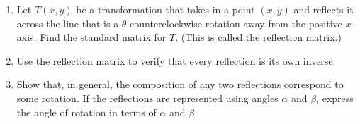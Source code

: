 \documentclass{article}
\begin{document}
\begin{enumerate}
\begin{enumerate}
        \item \(\cos(\alpha - \beta) = \cos\alpha\cos\beta + \sin\alpha\sin\beta\)\begin{proof}
            From \textbf{b}, we have\[
                \begin{bmatrix}
                    \colorbox{Periwinkle!42}{\(\cos\alpha\cos\beta + \sin\alpha\sin\beta\)}&-\sin\alpha\cos\beta+\cos\alpha\sin\beta \\ 
                    \sin\alpha\cos\beta - \cos\alpha\sin\beta& \sin\alpha\sin\beta + \cos\alpha\cos\beta
                \end{bmatrix} = \begin{bmatrix}
                    \colorbox{Periwinkle!42}{\(\cos(\alpha - \beta)\)}&-\sin(\alpha - \beta) \\ \sin(\alpha-\beta)&\cos(\alpha - \beta)
                \end{bmatrix},
            \] so \(\cos(\alpha - \beta) = \cos\alpha\cos\beta + \sin\alpha\sin\beta\), which proves the identity. 
        \end{proof}
    \end{enumerate}
    \item Let \(T(x,y)\) be a transformation that takes in a point \((x,y)\) and reflects it across the line that is a \(\theta\) counterclockwise rotation away from the positive \(x\)-axis. 
    Find the standard matrix for \(T\). (This is called the reflection matrix.)
    \item Use the reflection matrix to verify that every reflection is its own inverse. 
    \item Show that, in general, the composition of any two reflections correspond to some rotation. If the reflections are represented using angles \(\alpha\) and \(\beta\), express the angle of rotation in terms of \(\alpha\) and \(\beta\). 
\end{enumerate}
\pagebreak 
\end{document}
